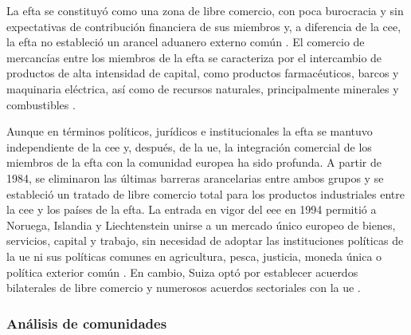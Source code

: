 La \gls{efta} se constituyó como una zona de libre comercio, con poca burocracia y sin expectativas de contribución financiera de sus miembros \parencite[p.~5]{Randwyck2011} y, a diferencia de la \gls{cee}, la \gls{efta} no estableció un arancel aduanero externo común \parencite[p.~181]{Leuffen2022}. El comercio de mercancías entre los miembros de la \gls{efta} se caracteriza por el intercambio de productos de alta intensidad de capital, como productos farmacéuticos, barcos y maquinaria eléctrica, así como de recursos naturales, principalmente minerales y combustibles \parencite{EFTA_Convention}.

Aunque en términos políticos, jurídicos e institucionales la \gls{efta} se mantuvo independiente de la \gls{cee} y, después, de la \gls{ue}, la integración comercial de los miembros de la \gls{efta} con la comunidad europea ha sido profunda. A partir de 1984, se eliminaron las últimas barreras arancelarias entre ambos grupos y se estableció un tratado de libre comercio total para los productos industriales entre la \gls{cee} y los países de la \gls{efta}. La entrada en vigor del \gls{eee} en 1994 permitió a Noruega, Islandia y Liechtenstein unirse a un mercado único europeo de bienes, servicios, capital y trabajo, sin necesidad de adoptar las instituciones políticas de la \gls{ue} ni sus políticas comunes en agricultura, pesca, justicia, moneda única o política exterior común \parencite[p.~5]{Leuffen2022}. En cambio, Suiza optó por establecer acuerdos bilaterales de libre comercio y numerosos acuerdos sectoriales con la \gls{ue} \parencite[p.~604]{EuropaDirectory2022}. 

\subsubsection{Análisis de comunidades}

